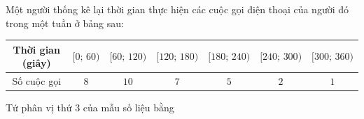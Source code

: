 \begin{ex}%
	Một người thống kê lại thời gian thực hiện các cuộc gọi điện thoại của người đó trong một tuần ở bảng sau:
	\begin{center}
		\begin{tabular}{|c|c|c|c|c|c|c|}
			\hline
			Thời gian (giây)& $ [0;\,60) $ & $ [60;\,120) $ & $ [120;\,180) $ & $ [180;\,240) $ & $ [240;\,300) $ & $ [300;\,360) $ \\
			\hline
			Số cuộc gọi & $ 8 $ & $ 10 $ & $ 7 $ & $ 5 $ & $ 2 $ & $ 1 $ \\
			\hline
		\end{tabular}
	\end{center}
Tứ phân vị thứ 3 của mẫu số liệu bằng
\end{ex}

